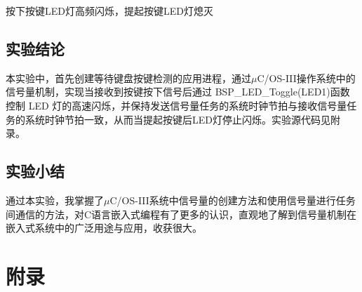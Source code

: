﻿\documentclass[UTF8,12pt]{article}
\begin{document}
按下按键LED灯高频闪烁，提起按键LED灯熄灭

\newpage

\subsection{实验结论}
本实验中，首先创建等待键盘按键检测的应用进程，通过$\mu$C/OS-III操作系统中的信号量机制，实现当接收到按键按下信号后通过 BSP\_LED\_Toggle(LED1)函数控制 LED 灯的高速闪烁，并保持发送信号量任务的系统时钟节拍与接收信号量任务的系统时钟节拍一致，从而当提起按键后LED灯停止闪烁。实验源代码见附录。

\subsection{实验小结}
通过本实验，我掌握了$\mu$C/OS-III系统中信号量的创建方法和使用信号量进行任务间通信的方法，对C语言嵌入式编程有了更多的认识，直观地了解到信号量机制在嵌入式系统中的广泛用途与应用，收获很大。

\newpage

\section{附录}
\end{document}
